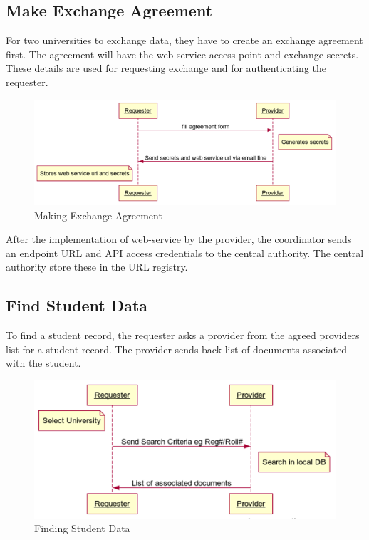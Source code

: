 \documentclass[12pt,a4paper,oneside]{book}
\begin{document}
    \subsection{Make Exchange Agreement}
    For two universities to exchange data, they have to create an exchange agreement first. The agreement will have the web-service access point and exchange secrets. These details are used for requesting exchange and for authenticating the requester.

\begin{figure}[!htp]
  \centering
  \includegraphics[width=14cm]{sq_agreement.png}
  \caption{Making Exchange Agreement}
  \label{fig:sq_agreement}
\end{figure}


After the implementation of web-service by the provider, the coordinator sends an endpoint URL and API access credentials to the central authority. The central authority store these in the URL registry.

    \subsection{Find Student Data}
    To find a student record, the requester asks a provider from the agreed providers list for a student record. The provider sends back list of documents associated with the student.

\begin{figure}[!hbp]
  \centering
  \includegraphics[width=14cm]{sq_find_student_data.png}
  \caption{Finding Student Data}
  \label{fig:sq_find_student_data}
\end{figure}
\end{document}
